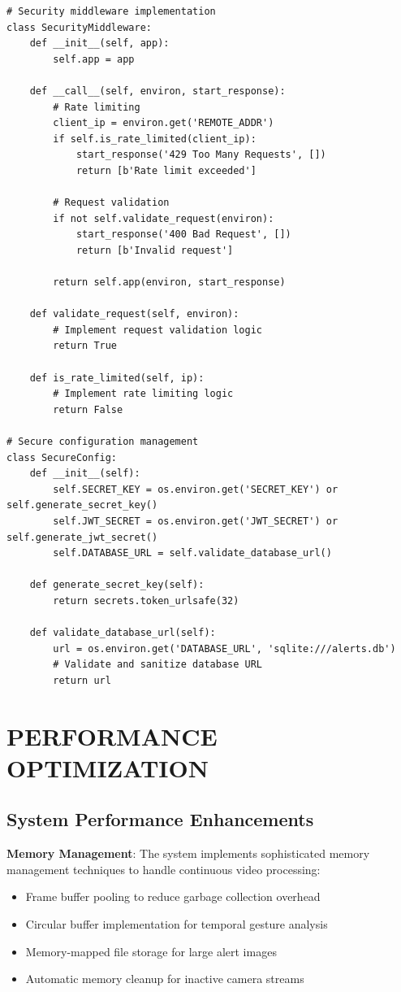 \documentclass[12pt,a4paper]{article}
\begin{document}
\begin{lstlisting}
# Security middleware implementation
class SecurityMiddleware:
    def __init__(self, app):
        self.app = app
        
    def __call__(self, environ, start_response):
        # Rate limiting
        client_ip = environ.get('REMOTE_ADDR')
        if self.is_rate_limited(client_ip):
            start_response('429 Too Many Requests', [])
            return [b'Rate limit exceeded']
        
        # Request validation
        if not self.validate_request(environ):
            start_response('400 Bad Request', [])
            return [b'Invalid request']
        
        return self.app(environ, start_response)
    
    def validate_request(self, environ):
        # Implement request validation logic
        return True
    
    def is_rate_limited(self, ip):
        # Implement rate limiting logic
        return False

# Secure configuration management
class SecureConfig:
    def __init__(self):
        self.SECRET_KEY = os.environ.get('SECRET_KEY') or self.generate_secret_key()
        self.JWT_SECRET = os.environ.get('JWT_SECRET') or self.generate_jwt_secret()
        self.DATABASE_URL = self.validate_database_url()
    
    def generate_secret_key(self):
        return secrets.token_urlsafe(32)
    
    def validate_database_url(self):
        url = os.environ.get('DATABASE_URL', 'sqlite:///alerts.db')
        # Validate and sanitize database URL
        return url
\end{lstlisting}

\newpage
\section{PERFORMANCE OPTIMIZATION}

\subsection{System Performance Enhancements}

\textbf{Memory Management}:
The system implements sophisticated memory management techniques to handle continuous video processing:

\begin{itemize}
    \item Frame buffer pooling to reduce garbage collection overhead
    \item Circular buffer implementation for temporal gesture analysis
    \item Memory-mapped file storage for large alert images
    \item Automatic memory cleanup for inactive camera streams
\end{itemize}
\end{document}
